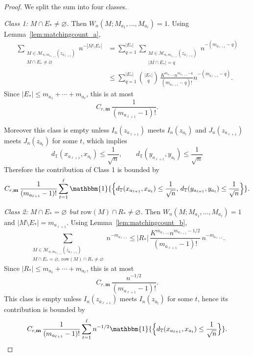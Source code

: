 \documentclass[11pt]{article}
\newcommand{\cM}{\mathcal{M}}
\newcommand{\abs}[1]{| #1|}
\newcommand{\bone}{\mathbbm{1}}
\begin{document}
\begin{proof}
We split the sum into four classes.

\smallskip
\noindent

\emph{Class 1: $M\cap E_*\neq\varnothing$.} Then $W_n(M;M_{a_1},\dots,M_{a_\ell})=1$. Using Lemma~\ref{lem:matchingcount_a},
\begin{align*}
\sum_{\substack{M\in \cM_{n,m_{a_{\ell+1}}}(z_{a_{\ell+1}})\\ M\cap E_*\neq\varnothing}}
n^{-\abs{M\setminus E_*}} &= \sum_{q = 1}^{ |E_*|}\sum_{\substack{M\in \cM_{n,m_{a_{\ell+1}}}(z_{a_{\ell+1}})\\ |M\cap E_*|=q}}
n^{-(m_{a_{\ell+1}} - q)} \\ 
& \leq \sum_{q = 1}^{|E_*|} {|E_*| \choose q}\,\frac{K^{m_{a_{\ell+1}}}n^{m_{a_{\ell+1}}-q}}{(m_{a_{\ell+1}}-q)!} n^{-(m_{a_{\ell+1}} - q)}.
\end{align*}
Since $|E_*|\le m_{a_1}+\cdots+m_{a_\ell}$, this is at most 
\[
C_{r,\mathbf m}\,\frac{1}{(m_{a_{\ell+1}}-1)!}.
\]


Moreover this class is empty unless $I_n(z_{a_{\ell+1}})$ meets
$I_n(z_{a_t})$ and $J_n(z_{a_{\ell+1}})$ meets $J_n(z_{a_t})$ for some $t$,
which implies
\[
d_{\mathbb{T}}(x_{a_{\ell + 1}}, x_{a_t}) \leq \frac{1}{\sqrt{n}}, \qquad d_{\mathbb{T}}(y_{a_{\ell + 1}}, y_{a_t}) \leq \frac{1}{\sqrt{n}}
\]
Therefore the contribution of Class 1 is bounded by
\[
C_{r,\mathbf m}\,\frac{1}{(m_{a_{\ell+1}}-1)!}
\sum_{t=1}^{\ell}
\bone{\Bigl\{d_{\mathbb{T}}(x_{a_{\ell + 1}}, x_{a_t}) \leq \frac{1}{\sqrt{n}}, \, d_{\mathbb{T}}(y_{a_{\ell + 1}}, y_{a_t}) \leq \frac{1}{\sqrt{n}}\Bigr\}}.
\]

\smallskip
\noindent
\emph{Class 2: $M\cap E_*=\varnothing$ but $\mathrm{row}(M)\cap R_*\neq\varnothing$.}
Then $W_n(M;M_{a_1},\dots,M_{a_\ell})=1$ and $\abs{M\setminus E_*} = m_{a_{\ell+1}}$.
Using Lemma~\ref{lem:matchingcount_b},
\[
\sum_{\substack{M\in \cM_{n,m_{a_{\ell+1}}}(z_{a_{\ell+1}})\\
M\cap E_*=\varnothing,\ \mathrm{row}(M)\cap R_*\neq\varnothing}}
n^{-m_{a_{\ell+1}}}
\le
|R_*|\,\frac{K^{m_{a_{\ell+1}}}n^{m_{a_{\ell+1}}-1/2}}{(m_{a_{\ell+1}}-1)!}\,
n^{-m_{a_{\ell+1}}}.
\]
Since $|R_*|\le m_{a_1}+\cdots+m_{a_\ell}$, this is at most
\[
C_{r,\mathbf m}\,\frac{n^{-1/2}}{(m_{a_{\ell+1}}-1)!}.
\]
This class is empty unless $I_n(z_{a_{\ell+1}})$ meets $I_n(z_{a_t})$ for some $t$,
hence its contribution is bounded by
\[
C_{r,\mathbf m}\,\frac{1}{(m_{a_{\ell+1}}-1)!}
\sum_{t=1}^{\ell} n^{-1/2}\bone{\Bigl\{d_{\mathbb{T}}(x_{a_{\ell + 1}}, x_{a_t}) \leq \frac{1}{\sqrt{n}}\Bigr\}}.
\]


\end{proof}
\end{document}
